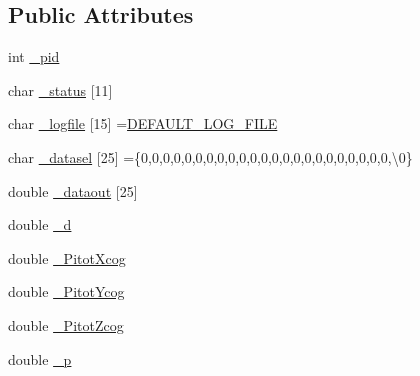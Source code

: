 \subsection*{Public Attributes}
\begin{DoxyCompactItemize}
\item 
int \hyperlink{class_air_d_c_a9c4b0adc82bd69694271041d3ac456b6}{\+\_\+pid}
\item 
char \hyperlink{class_air_d_c_a17c12091517ab30dd91546e89794aebf}{\+\_\+status} \mbox{[}11\mbox{]}
\item 
char \hyperlink{class_air_d_c_acb628ebdccdf9729d5a5952ea62019d2}{\+\_\+logfile} \mbox{[}15\mbox{]} =\hyperlink{_air_d_c_8h_a2ecbb6b97620287d0a619efd366a2b46}{D\+E\+F\+A\+U\+L\+T\+\_\+\+L\+O\+G\+\_\+\+F\+I\+LE}
\item 
char \hyperlink{class_air_d_c_a6a1f928a4a8de4050099d48790cd032c}{\+\_\+datasel} \mbox{[}25\mbox{]} =\{\textquotesingle{}0\textquotesingle{},\textquotesingle{}0\textquotesingle{},\textquotesingle{}0\textquotesingle{},\textquotesingle{}0\textquotesingle{},\textquotesingle{}0\textquotesingle{},\textquotesingle{}0\textquotesingle{},\textquotesingle{}0\textquotesingle{},\textquotesingle{}0\textquotesingle{},\textquotesingle{}0\textquotesingle{},\textquotesingle{}0\textquotesingle{},\textquotesingle{}0\textquotesingle{},\textquotesingle{}0\textquotesingle{},\textquotesingle{}0\textquotesingle{},\textquotesingle{}0\textquotesingle{},\textquotesingle{}0\textquotesingle{},\textquotesingle{}0\textquotesingle{},\textquotesingle{}0\textquotesingle{},\textquotesingle{}0\textquotesingle{},\textquotesingle{}0\textquotesingle{},\textquotesingle{}0\textquotesingle{},\textquotesingle{}0\textquotesingle{},\textquotesingle{}0\textquotesingle{},\textquotesingle{}0\textquotesingle{},\textquotesingle{}\textbackslash{}0\textquotesingle{}\}
\item 
double \hyperlink{class_air_d_c_a6bd70f2cb324e1931c11e887bf587fff}{\+\_\+dataout} \mbox{[}25\mbox{]}
\item 
double \hyperlink{class_air_d_c_aa537425056f6d4cef77dd47100b1a577}{\+\_\+d}
\item 
double \hyperlink{class_air_d_c_a763dea78cd7b72ab32b8e3389d4b5748}{\+\_\+\+Pitot\+Xcog}
\item 
double \hyperlink{class_air_d_c_accf4f5a99feb4bf08dacebe46da31bc6}{\+\_\+\+Pitot\+Ycog}
\item 
double \hyperlink{class_air_d_c_a49979a01949fd019b5743f763d45bd31}{\+\_\+\+Pitot\+Zcog}
\item 
double \hyperlink{class_air_d_c_a0b72bf365fbe266f90f3f6474b6a412f}{\+\_\+p}

\end{DoxyCompactItemize}

